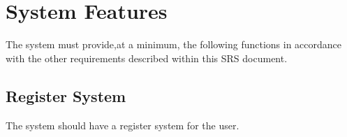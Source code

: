 \documentclass{scrreprt}
\begin{document}



\chapter{System Features}
The system must provide,at a minimum, the following functions
in accordance with the other requirements described within
this SRS document.

\section{Register System}
The system should have a register system for the user.
\end{document}

